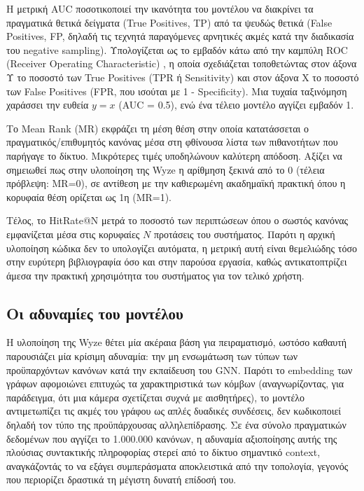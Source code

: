 Η μετρική AUC ποσοτικοποιεί την ικανότητα του μοντέλου να διακρίνει τα πραγματικά θετικά δείγματα (True Positives, TP) από τα ψευδώς θετικά (False Positives, FP, δηλαδή τις τεχνητά παραγόμενες αρνητικές ακμές κατά την διαδικασία του negative sampling). Υπολογίζεται ως το εμβαδόν κάτω από την καμπύλη ROC (Receiver Operating Characteristic) \cite{fawcett_introduction_2006}, η οποία σχεδιάζεται τοποθετώντας στον άξονα Υ το ποσοστό των True Positives (TPR ή Sensitivity) και στον άξονα Χ το ποσοστό των False Positives (FPR, που ισούται με 1 - Specificity). Μια τυχαία ταξινόμηση χαράσσει την ευθεία $y=x$ (AUC = 0.5), ενώ ένα τέλειο μοντέλο αγγίζει εμβαδόν 1.

Το Mean Rank (MR) \cite{bordes_translating_2013} εκφράζει τη μέση θέση στην οποία κατατάσσεται ο πραγματικός/επιθυμητός κανόνας μέσα στη φθίνουσα λίστα των πιθανοτήτων που παρήγαγε το δίκτυο. Μικρότερες τιμές υποδηλώνουν καλύτερη απόδοση. Αξίζει να σημειωθεί πως στην υλοποίηση της Wyze η αρίθμηση ξεκινά από το 0 (τέλεια πρόβλεψη: MR=0), σε αντίθεση με την καθιερωμένη ακαδημαϊκή πρακτική όπου η κορυφαία θέση ορίζεται ως 1η (MR=1).

Τέλος, το HitRate@N \cite{bordes_translating_2013} μετρά το ποσοστό των περιπτώσεων όπου ο σωστός κανόνας εμφανίζεται μέσα στις κορυφαίες $N$ προτάσεις του συστήματος. Παρότι η αρχική υλοποίηση κώδικα δεν το υπολογίζει αυτόματα, η μετρική αυτή είναι θεμελιώδης τόσο στην ευρύτερη βιβλιογραφία όσο και στην παρούσα εργασία, καθώς αντικατοπτρίζει άμεσα την πρακτική χρησιμότητα του συστήματος για τον τελικό χρήστη.

\subsection{Οι αδυναμίες του μοντέλου}\label{ssec:weaknesses}
Η υλοποίηση της Wyze θέτει μία ακέραια βάση για πειραματισμό, ωστόσο καθαυτή παρουσιάζει μία κρίσιμη αδυναμία: την μη ενσωμάτωση των τύπων των προϋπαρχόντων κανόνων κατά την εκπαίδευση του GNN. Παρότι το embedding των γράφων αφομοιώνει επιτυχώς τα χαρακτηριστικά των κόμβων (αναγνωρίζοντας, για παράδειγμα, ότι μια κάμερα σχετίζεται συχνά με αισθητήρες), το μοντέλο αντιμετωπίζει τις ακμές του γράφου ως απλές δυαδικές συνδέσεις, δεν κωδικοποιεί δηλαδή τον τύπο της προϋπάρχουσας αλληλεπίδρασης. Σε ένα σύνολο πραγματικών δεδομένων που αγγίζει το 1.000.000 κανόνων, η αδυναμία αξιοποίησης αυτής της πλούσιας συντακτικής πληροφορίας στερεί από το δίκτυο σημαντικό context, αναγκάζοντάς το να εξάγει συμπεράσματα αποκλειστικά από την τοπολογία, γεγονός που περιορίζει δραστικά τη μέγιστη δυνατή επίδοσή του.

